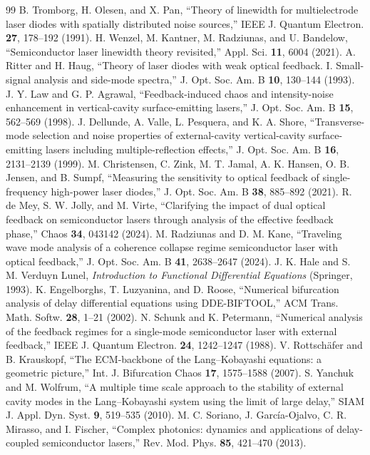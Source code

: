 \documentclass{optica-article}
\begin{document}
\begin{thebibliography}{99}
 B. Tromborg, H. Olesen, and X. Pan, ``Theory of linewidth for multielectrode laser diodes with spatially distributed noise sources,'' IEEE J. Quantum Electron. \textbf{27}, 178--192 (1991).
 H. Wenzel, M. Kantner, M. Radziunas, and U. Bandelow, ``Semiconductor laser linewidth theory revisited,'' Appl. Sci. \textbf{11}, 6004 (2021).
 A. Ritter and H. Haug, ``Theory of laser diodes with weak optical feedback. I. Small-signal analysis and side-mode spectra,'' J. Opt. Soc. Am. B \textbf{10}, 130--144 (1993).
 J. Y. Law and G. P. Agrawal, ``Feedback-induced chaos and intensity-noise enhancement in vertical-cavity surface-emitting lasers,'' J. Opt. Soc. Am. B \textbf{15}, 562--569 (1998).
 J. Dellunde, A. Valle, L. Pesquera, and K. A. Shore, ``Transverse-mode selection and noise properties of external-cavity vertical-cavity surface-emitting lasers including multiple-reflection effects,'' J. Opt. Soc. Am. B \textbf{16}, 2131--2139 (1999).
 M. Christensen, C. Zink, M. T. Jamal, A. K. Hansen, O. B. Jensen, and B. Sumpf, ``Measuring the sensitivity to optical feedback of single-frequency high-power laser diodes,'' J. Opt. Soc. Am. B \textbf{38}, 885--892 (2021).
 R. de Mey, S. W. Jolly, and M. Virte, ``Clarifying the impact of dual optical feedback on semiconductor lasers through analysis of the effective feedback phase,'' Chaos \textbf{34}, 043142 (2024).
 M. Radziunas and D. M. Kane, ``Traveling wave mode analysis of a coherence collapse regime semiconductor laser with optical feedback,'' J. Opt. Soc. Am. B \textbf{41}, 2638--2647 (2024).
 J. K. Hale and S. M. Verduyn Lunel, \textit{Introduction to Functional Differential Equations} (Springer, 1993).
 K. Engelborghs, T. Luzyanina, and D. Roose, ``Numerical bifurcation analysis of delay differential equations using DDE-BIFTOOL,'' ACM Trans. Math. Softw. \textbf{28}, 1--21 (2002).
 N. Schunk and K. Petermann, ``Numerical analysis of the feedback regimes for a single-mode semiconductor laser with external feedback,'' IEEE J. Quantum Electron. \textbf{24}, 1242--1247 (1988).
 V. Rottsch\"afer and B. Krauskopf, ``The ECM-backbone of the Lang--Kobayashi equations: a geometric picture,'' Int. J. Bifurcation Chaos \textbf{17}, 1575--1588 (2007).
 S. Yanchuk and M. Wolfrum, ``A multiple time scale approach to the stability of external cavity modes in the Lang--Kobayashi system using the limit of large delay,'' SIAM J. Appl. Dyn. Syst. \textbf{9}, 519--535 (2010).
 M. C. Soriano, J. Garc\'ia-Ojalvo, C. R. Mirasso, and I. Fischer, ``Complex photonics: dynamics and applications of delay-coupled semiconductor lasers,'' Rev. Mod. Phys. \textbf{85}, 421--470 (2013).
\end{thebibliography}
\end{document}
